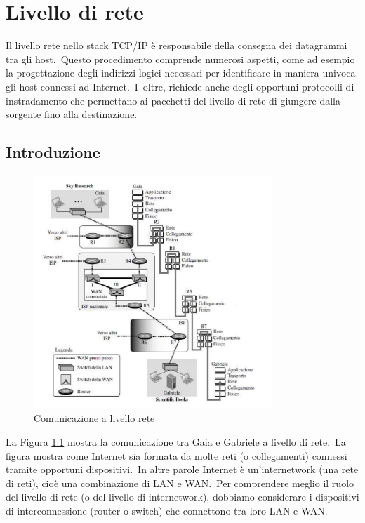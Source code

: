 \chapter{Livello di rete}

Il livello rete nello stack TCP/IP è responsabile della consegna dei datagrammi tra gli host.\
Questo procedimento comprende numerosi aspetti, come ad esempio la progettazione degli indirizzi logici necessari per identificare in maniera univoca gli host connessi ad Internet.\
I\
oltre, richiede anche degli opportuni protocolli di instradamento che permettano ai pacchetti del livello di rete di giungere dalla sorgente fino alla destinazione.

\section{Introduzione}

\begin{figure}[H]
    \centering
    \includegraphics[width = 0.8\textwidth]{immagini/Livello_Rete.jpg}
    \caption{Comunicazione a livello rete}
    \label{fig}
\end{figure}

\noindent La Figura \ref{fig} mostra la comunicazione tra Gaia e Gabriele a livello di rete.\
La figura mostra come Internet sia formata da molte reti (o collegamenti) connessi tramite opportuni dispositivi.\
In altre parole Internet è un'internetwork (una rete di reti), cioè una combinazione di LAN e WAN.\
Per comprendere meglio il ruolo del livello di rete (o del livello di internetwork), dobbiamo considerare i dispositivi di interconnessione (router o switch) che connettono tra loro LAN e WAN.

